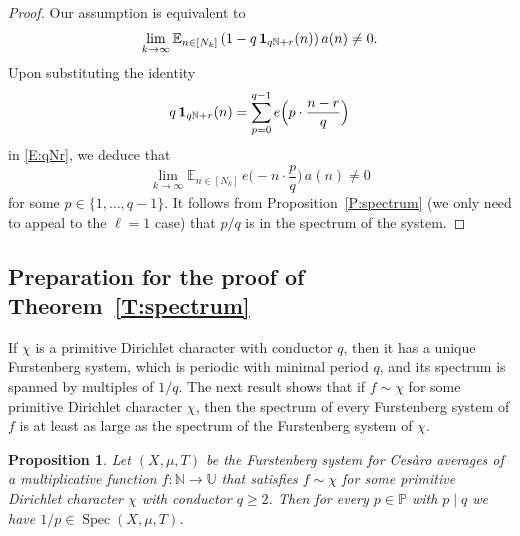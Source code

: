 \documentclass[11pt]{amsart}
\newtheorem{proposition}[lemma]{Proposition}
\theoremstyle{definition}
\newcommand{\E}{{\mathbb E}}
\newcommand{\N}{{\mathbb N}}
\renewcommand{\P}{{\mathbb P}}
\newcommand{\U}{{\mathbb U}}
\DeclareMathOperator{\spec}{Spec}
\begin{document}
\begin{proof}
 Our assumption is equivalent to
\begin{equation}\label{E:qNr}
\lim_{k\to\infty} \E_{n\in [N_k]} \, (1- q\, {\bf 1}_{q\N+r}(n))\, a(n)\neq 0.
\end{equation}
Upon substituting the identity
$$
q\, {\bf 1}_{q\N+r}(n)=\sum_{p=0}^{q-1}e\Big(p\cdot \frac{n-r}{q}\Big)
$$
in \eqref{E:qNr},
we deduce that
$$
\lim_{k\to\infty} \E_{n\in [N_k]} \, e\Big(-n\cdot \frac{p}{q}\Big) \, a(n)\neq 0
$$
for some  $p\in \{1,\ldots, q-1\}$. It follows from Proposition~\ref{P:spectrum} (we only need to appeal to  the $\ell=1$ case) that $p/q$ is in the spectrum of the system.
\end{proof}


\subsection{Preparation for the proof of  Theorem~\ref{T:spectrum}}
 If $\chi$ is a primitive Dirichlet character with conductor $q$, then it has a unique Furstenberg system, which  is periodic with minimal period $q$, and its spectrum is spanned by multiples of $1/q$. 
The next result shows that if $f\sim \chi$ for some primitive Dirichlet character $\chi$, then the spectrum of every Furstenberg system of $f$ is at least as large as the spectrum of the Furstenberg system of $\chi$.
\begin{proposition}\label{P:fsimchi}
Let $(X,\mu, T)$ be the Furstenberg system for Ces\`aro averages  of a  multiplicative function  $f\colon \N\to \U$ that satisfies $f\sim \chi$ for some primitive Dirichlet character $\chi$ with conductor $q\geq 2$. 
Then for every $p\in \P$ with $p\mid q$ we have $1/p\in \spec(X,\mu,T)$. 
\end{proposition}
\end{document}
